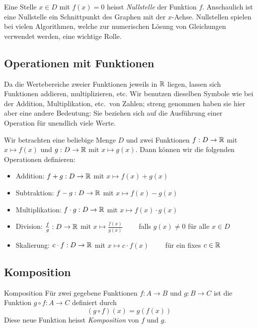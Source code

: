 Eine Stelle $x \in D$ mit $f(x) = 0$ heisst \emph{Nullstelle} der Funktion $f$.
Anschaulich ist eine Nullstelle ein Schnittpunkt des Graphen mit der $x$-Achse.
Nullstellen spielen bei vielen Algorithmen, welche zur numerischen Lösung von Gleichungen verwendet werden, eine wichtige Rolle.

\subsection{Operationen mit Funktionen}\label{subsec:operationen-mit-funktionen}

Da die Wertebereiche zweier Funktionen jeweils in $\mathbb{R}$ liegen, lassen sich Funktionen addieren, multiplizieren, etc.
Wir benutzen dieselben Symbole wie bei der Addition, Multiplikation, etc.\ von Zahlen;
streng genommen haben sie hier aber eine andere Bedeutung: Sie beziehen sich auf die Ausführung einer Operation für unendlich viele Werte.

\begin{definition}{}
    Wir betrachten eine beliebige Menge $D$ und zwei Funktionen $f : D \rightarrow \mathbb{R}$ mit $x \mapsto f(x)$ und $g : D \rightarrow \mathbb{R}$ mit $x \mapsto g(x)$.
    Dann können wir die folgenden Operationen definieren:
    \begin{itemize}
        \item Addition: $f + g : D \rightarrow \mathbb{R}$ mit $x \mapsto f(x) + g(x)$
        \item Subtraktion: $f - g : D \rightarrow \mathbb{R}$ mit $x \mapsto f(x) - g(x)$
        \item Multiplikation: $f \cdot g : D \rightarrow \mathbb{R}$ mit $x \mapsto f(x) \cdot g(x)$
        \item Division: $\frac{f}{g} : D \rightarrow \mathbb{R}$ mit $x \mapsto \frac{f(x)} {g(x)} \quad\quad$ falls $g(x) \neq 0$ für alle $x \in D$
        \item Skalierung: $c \cdot f : D \rightarrow \mathbb{R}$ mit $x \mapsto c \cdot f(x) \quad\quad$ für ein fixes $c \in \mathbb{R}$
    \end{itemize}
\end{definition}

\subsection{Komposition}\label{subsec:komposition}

\begin{definition}{Komposition}
    Für zwei gegebene Funktionen $f : A \rightarrow B$ und $g : B \rightarrow C$ ist die Funktion $g \circ f : A \rightarrow C$ definiert durch \[(g \circ f)(x) = g(f(x))\]
    Diese neue Funktion heisst \emph{Komposition} von $f$ und $g$.
\end{definition}

